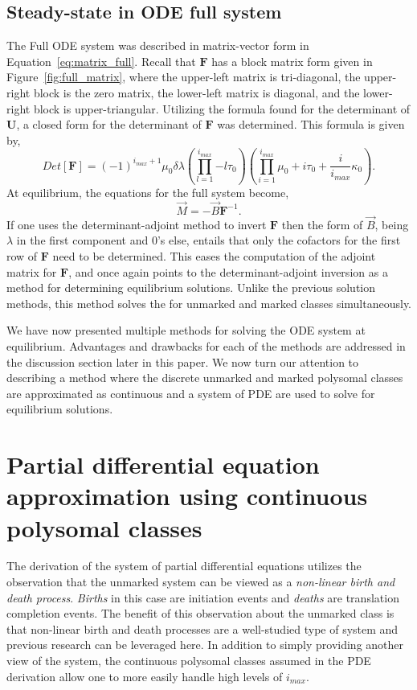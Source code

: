 \documentclass[review]{elsarticle}
\let\bs\boldsymbol
\begin{document}
\subsection{Steady-state in ODE full system}
The Full ODE system was described in matrix-vector form in Equation~\ref{eq:matrix_full}.
Recall that $\bs{F}$ has a block matrix form given in Figure~\ref{fig:full_matrix}, where the upper-left matrix is tri-diagonal, the upper-right block is the zero matrix, the lower-left matrix is diagonal, and the lower-right block is upper-triangular.
Utilizing the formula found for the determinant of $\bs{U}$, a closed form for the determinant of $\bs{F}$ was determined.
This formula is given by,
\begin{equation}\label{eq:full_matrix_det}
Det[\bs{F}]=(-1)^{i_{max}+1}\mu_0 \delta \lambda \left(\prod_{l=1}^{i_{max}}{-l\tau_0}\right)\left(\prod_{i=1}^{i_{max}}{\mu_0 +i \tau_0 + \frac{i}{i_{max}}\kappa_0}\right).
\end{equation}
At equilibrium, the equations for the full system become,
\begin{equation}
\vec{M}=-\vec{B}\bs{F}^{-1}.
\end{equation}
If one uses the determinant-adjoint method to invert $\bs{F}$ then the form of $\vec{B}$, being $\lambda$ in the first component and 0's else, entails that only the cofactors for the first row of $\bs{F}$ need to be determined.
This eases the computation of the adjoint matrix for $\bs{F}$, and once again points to the determinant-adjoint inversion as a method for determining equilibrium solutions.
Unlike the previous solution methods, this method solves the for unmarked and marked classes simultaneously.

We have now presented multiple methods for solving the ODE system at equilibrium.
Advantages and drawbacks for each of the methods are addressed in the discussion section later in this paper.
We now turn our attention to describing a method where the discrete unmarked and marked polysomal classes are approximated as continuous and a system of PDE are used to solve for equilibrium solutions.

\section{Partial differential equation approximation using continuous polysomal classes}
The derivation of the system of partial differential equations utilizes the observation that the unmarked system can be viewed as a \emph{non-linear birth and death process}. \emph{Births} in this case are initiation events and \emph{deaths} are translation completion events.
The benefit of this observation about the unmarked class is that non-linear birth and death processes are a well-studied type of system and previous research can be leveraged here.
In addition to simply providing another view of the system, the continuous polysomal classes assumed in the PDE derivation allow one to more easily handle high levels of $i_{max}$.
\end{document}
